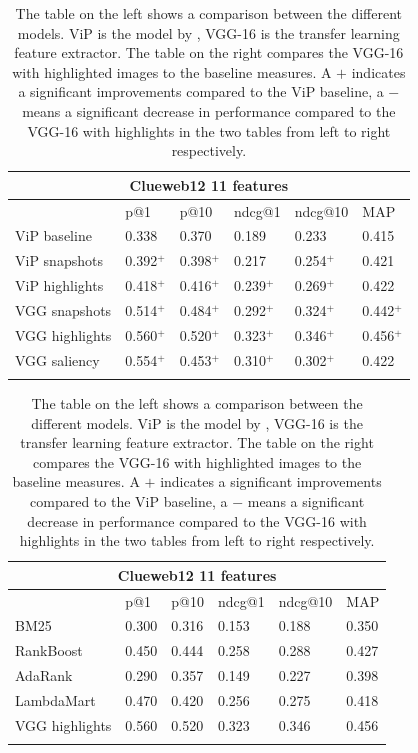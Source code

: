 \begin{table}[t]
\caption{The table on the left shows a comparison between the different models. ViP is the model by \citet{fan2017learning}, VGG-16 is the transfer learning feature extractor. The table on the right compares the VGG-16 with highlighted images to the baseline measures. A $+$ indicates a significant improvements compared to the ViP baseline, a $-$ means a significant decrease in performance compared to the VGG-16 with highlights in the two tables from left to right respectively. 
}
\label{tab:results}
\centering
\begin{tabular}{llllll}
\toprule
\multicolumn{6}{c}{Clueweb12 11 features}                                    \\ 
\midrule
                      & p@1    & p@10  & ndcg@1  & ndcg@10 & MAP   \\ 
\midrule
ViP baseline          & 0.338  & 0.370 & 0.189   & 0.233   & 0.415 \\ 
\midrule
ViP snapshots         & 0.392$^+$ & 0.398$^+$ & 0.217   & 0.254$^+$   & 0.421 \\ 
\midrule
ViP highlights        & 0.418$^+$  & 0.416$^+$ & 0.239$^+$   & 0.269$^+$   & 0.422 \\
VGG snapshots      & 0.514$^+$    & 0.484$^+$ & 0.292$^+$   & 0.324$^+$   & 0.442$^+$ \\ 
VGG highlights     & 0.560$^+$    & 0.520$^+$ & 0.323$^+$   & 0.346$^+$   & 0.456$^+$ \\ 
\midrule
VGG saliency       & 0.554$^+$    & 0.453$^+$ & 0.310$^+$   & 0.302$^+$   & 0.422 \\  \\
\bottomrule
\end{tabular}

\begin{tabular}{llllll}
\toprule
\multicolumn{6}{c}{Clueweb12 11 features}                                    \\ 
\midrule
                      & p@1    & p@10  & ndcg@1  & ndcg@10 & MAP   \\
\midrule
BM25                  & 0.300  & 0.316 & 0.153   & 0.188   & 0.350 \\ 
\midrule
RankBoost             & 0.450  & 0.444 & 0.258   & 0.288   & 0.427 \\
AdaRank               & 0.290  & 0.357 & 0.149   & 0.227   & 0.398 \\
LambdaMart            & 0.470  & 0.420 & 0.256   & 0.275   & 0.418 \\ 
\midrule
VGG highlights        & 0.560  & 0.520 & 0.323   & 0.346   & 0.456 \\ 
\bottomrule
\\
\end{tabular}
\end{table}



